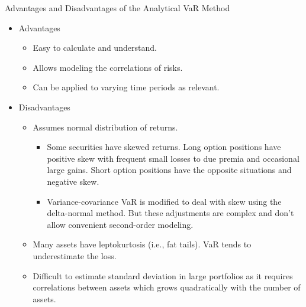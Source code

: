 \documentclass[../custom,grid]{flashcards}
\newcommand{\studyArea}{Risk Management}
\begin{document}
\begin{flashcard}[\studyArea]{Advantages and Disadvantages of the Analytical VaR Method}
    \begin{itemize}
        \item Advantages
        \begin{itemize}
            \item Easy to calculate and understand.
            \item Allows modeling the correlations of risks.
            \item Can be applied to varying time periods as relevant.
        \end{itemize}
        \item Disadvantages
        \begin{itemize}
            \item Assumes normal distribution of returns.
                \begin{itemize}
                    \item Some securities have skewed returns. Long option positions have positive skew with frequent small losses to due premia and occasional large gains. Short option positions have the opposite situations and negative skew.
                    \item Variance-covariance VaR is modified to deal with skew using the delta-normal method. But these adjustments are complex and don't allow convenient second-order modeling.
                \end{itemize}
            \item Many assets have leptokurtosis (i.e., fat tails). VaR tends to underestimate the loss.
            \item Difficult to estimate standard deviation in large portfolios as it requires correlations between assets which grows quadratically with the number of assets.
        \end{itemize}
    \end{itemize}
\end{flashcard}
\end{document}
